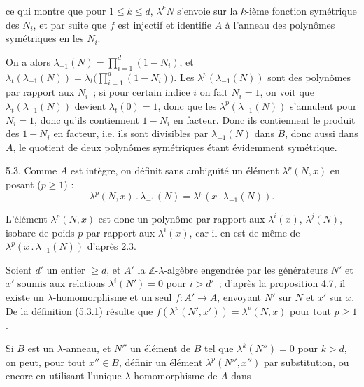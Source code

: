 
ce qui
montre que pour \(1\le k\le d\), \(\lambda^k N\) s'envoie sur la \(k\)-ième fonction symétrique des \(N_i\), et par suite que \(f\) est injectif et identifie \(A\) à l'anneau des polynômes symétriques en les \(N_i\).

On a alors \(\lambda_{-1}(N)=\prod_{i=1}^{d}(1-N_i)\), et \(\lambda_t(\lambda_{-1}(N))=\lambda_t\bigl(\prod_{i=1}^{d}(1-N_i)\bigr)\). Les \(\lambda^p(\lambda_{-1}(N))\) sont des polynômes par rapport aux \(N_i\)~; si pour certain indice \(i\) on fait \(N_i=1\), on voit que \(\lambda_t(\lambda_{-1}(N))\) devient \(\lambda_t(0)=1\), donc que les \(\lambda^p(\lambda_{-1}(N))\) s'annulent pour \(N_i=1\), donc qu'ils contiennent \(1-N_i\) en facteur. Donc ils contiennent le produit des \(1-N_i\) en facteur, i.e. ils sont divisibles par \(\lambda_{-1}(N)\) dans \(B\), donc aussi dans \(A\), le quotient de deux polynômes symétriques étant évidemment symétrique.

5.3. Comme \(A\) est intègre, on définit sans ambiguïté un élément \(\lambda^p(N,x)\) en posant (\(p\ge1\)) :
\begin{equation}\tag{5.3.1}
  \lambda^p(N,x)\mathbin{.}\lambda_{-1}(N)=\lambda^p(x\mathbin{.}\lambda_{-1}(N)).
\end{equation}

L'élément \(\lambda^p(N,x)\) est donc un polynôme par rapport aux \(\lambda^i(x)\), \(\lambda^j(N)\), isobare de poids \(p\) par rapport aux \(\lambda^i(x)\), car il en est de même de \(\lambda^p(x\mathbin{.}\lambda_{-1}(N))\) d'après 2.3.

Soient \(d'\) un entier \(\ge d\), et \(A'\) la \(\mathbb Z\)-\(\lambda\)-algèbre engendrée par les générateurs \(N'\) et \(x'\) soumis aux relations \(\lambda^i(N')=0\) pour \(i>d'\)~; d'après la proposition 4.7, il existe un \(\lambda\)-homomorphisme et un seul \(f:A'\longrightarrow A\), envoyant \(N'\) sur \(N\) et \(x'\) sur \(x\). De la définition (5.3.1) résulte que \(f(\lambda^p(N',x'))=\lambda^p(N,x)\) pour tout \(p\ge1\).

Si \(B\) est un \(\lambda\)-anneau, et \(N''\) un élément de \(B\) tel que \(\lambda^k(N'')=0\) pour \(k>d\), on peut, pour tout \(x''\in B\), définir un élément \(\lambda^p(N'',x'')\) par substitution, ou encore en utilisant l'unique \(\lambda\)-homomorphisme de \(A\) dans 
